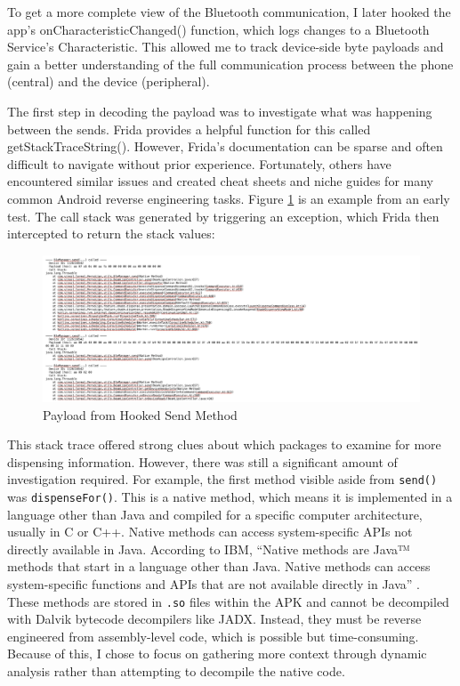 To get a more complete view of the Bluetooth communication, I later hooked the app’s onCharacteristicChanged() function, which logs changes to a Bluetooth Service's Characteristic. This allowed me to track device-side byte payloads and gain a better understanding of the full communication process between the phone (central) and the device (peripheral).

The first step in decoding the payload was to investigate what was happening between the sends. Frida provides a helpful function for this called getStackTraceString(). However, Frida’s documentation can be sparse and often difficult to navigate without prior experience. Fortunately, others have encountered similar issues and created cheat sheets and niche guides for many common Android reverse engineering tasks. Figure \ref{fig:hookedpayload} is an example from an early test. The call stack was generated by triggering an exception, which Frida then intercepted to return the stack values:
\begin{figure}[H]
	\centering
	\includegraphics[scale=.225]{hooked_payload}
	\caption{Payload from Hooked Send Method}
	\label{fig:hookedpayload}
\end{figure}

This stack trace offered strong clues about which packages to examine for more dispensing information. However, there was still a significant amount of investigation required. For example, the first method visible aside from \texttt{send()} was \texttt{dispenseFor()}. This is a native method, which means it is implemented in a language other than Java and compiled for a specific computer architecture, usually in C or C++. Native methods can access system-specific APIs not directly available in Java. According to IBM, “Native methods are Java™ methods that start in a language other than Java. Native methods can access system-specific functions and APIs that are not available directly in Java” \cite{ibmNativeMethods}. These methods are stored in \texttt{.so} files within the APK and cannot be decompiled with Dalvik bytecode decompilers like JADX. Instead, they must be reverse engineered from assembly-level code, which is possible but time-consuming. Because of this, I chose to focus on gathering more context through dynamic analysis rather than attempting to decompile the native code.  

